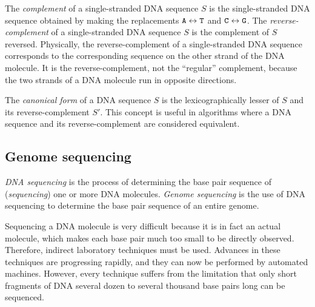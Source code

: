 \documentclass[12pt]{article}
\newcommand\Base[1]{{\tt #1}}
\newcommand{\KeyTerm}[1]{{\it #1}}
\begin{document}
The \KeyTerm{complement} of a single-stranded DNA sequence $S$ is the
single-stranded DNA sequence obtained by making the replacements $\Base{A}
\leftrightarrow \Base{T}$ and $\Base{C} \leftrightarrow \Base{G}$.  The
\KeyTerm{reverse-complement} of a single-stranded DNA sequence $S$ is the
complement of $S$ reversed.  Physically, the reverse-complement of a
single-stranded DNA sequence corresponds to the corresponding sequence on the
other strand of the DNA molecule.  It is the reverse-complement, not the
``regular'' complement, because the two strands of a DNA molecule run in
opposite directions.

The \KeyTerm{canonical form} of a DNA sequence $S$ is the lexicographically
lesser of $S$ and its reverse-complement $S'$.  This concept is useful in
algorithms where a DNA sequence and its reverse-complement are considered
equivalent.

\subsection{Genome sequencing}

\KeyTerm{DNA sequencing} is the process of determining the base pair sequence of
(\KeyTerm{sequencing}) one or more DNA molecules.  \KeyTerm{Genome sequencing}
is the use of DNA sequencing to determine the base pair sequence of an entire
genome.

Sequencing a DNA molecule is very difficult because it is in fact an actual
molecule, which makes each base pair much too small to be directly observed.
Therefore, indirect laboratory techniques must be used.  Advances in these
techniques are progressing rapidly, and they can now be performed by automated
machines.  However, every technique suffers from the limitation that only short
fragments of DNA several dozen to several thousand base pairs long can be
sequenced.
\end{document}
